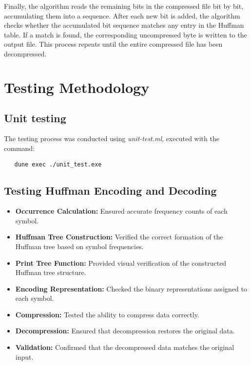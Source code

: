 \documentclass[12pt,oneside,letterpaper,english]{article}
\begin{document}
Finally, the algorithm reads the remaining bits in the compressed file bit by bit, accumulating them into a sequence. After each new bit is added, the algorithm checks whether the accumulated bit sequence matches any entry in the Huffman table. If a match is found, the corresponding uncompressed byte is written to the output file. This process repeats until the entire compressed file has been decompressed.


\section{Testing Methodology}
\subsection*{Unit testing}
The testing process was conducted using \textit{unit-test.ml}, executed with the command:
\begin{center}
\begin{verbatim}
   dune exec ./unit_test.exe 
\end{verbatim}
\end{center}
\subsection*{Testing Huffman Encoding and Decoding}
\begin{itemize}
    \item \textbf{Occurrence Calculation:} Ensured accurate frequency counts of each symbol.
    \item \textbf{Huffman Tree Construction:} Verified the correct formation of the Huffman tree based on symbol frequencies.
    \item \textbf{Print Tree Function:} Provided visual verification of the constructed Huffman tree structure.
    \item \textbf{Encoding Representation:} Checked the binary representations assigned to each symbol.
    \item \textbf{Compression:} Tested the ability to compress data correctly.
    \item \textbf{Decompression:} Ensured that decompression restores the original data.
    \item \textbf{Validation:} Confirmed that the decompressed data matches the original input.
\end{itemize}
\end{document}

